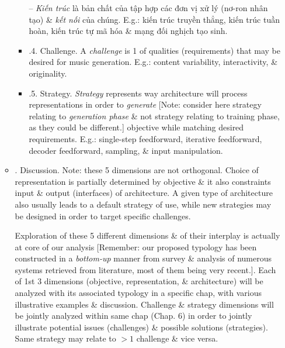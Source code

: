 \documentclass{article}
\begin{document}
\begin{itemize}
\begin{itemize}
\begin{itemize}
			-- {\it Kiến trúc} là bản chất của tập hợp các đơn vị xử lý {\it} (nơ-ron nhân tạo) \& {\it kết nối} của chúng. E.g.: kiến trúc truyền thẳng, kiến trúc tuần hoàn, kiến trúc tự mã hóa \& mạng đối nghịch tạo sinh.
			\item {.4. Challenge.} A {\it challenge} is 1 of qualities (requirements) that may be desired for music generation. E.g.: content variability, interactivity, \& originality.
			\item {.5. Strategy.} {\it Strategy} represents way architecture will process representations in order to {\it generate} [Note: consider here strategy relating to {\it generation phase} \& not strategy relating to training phase, as they could be different.] objective while matching desired requirements. E.g.: single-step feedforward, iterative feedforward, decoder feedforward, sampling, \& input manipulation.
		\end{itemize}
		\item {. Discussion.} Note: these 5 dimensions are not orthogonal. Choice of representation is partially determined by objective \& it also constraints input \& output (interfaces) of architecture. A given type of architecture also usually leads to a default strategy of use, while new strategies may be designed in order to target specific challenges.

		Exploration of these 5 different dimensions \& of their interplay is actually at core of our analysis [Remember: our proposed typology has been constructed in a {\it bottom-up} manner from survey \& analysis of numerous systems retrieved from literature, most of them being very recent.]. Each of 1st 3 dimensions (objective, representation, \& architecture) will be analyzed with its associated typology in a specific chap, with various illustrative examples \& discussion. Challenge \& strategy dimensions will be jointly analyzed within same chap (Chap. 6) in order to jointly illustrate potential issues (challenges) \& possible solutions (strategies). Same strategy may relate to $> 1$ challenge \& vice versa.


\end{itemize}
\end{itemize}
\end{document}
